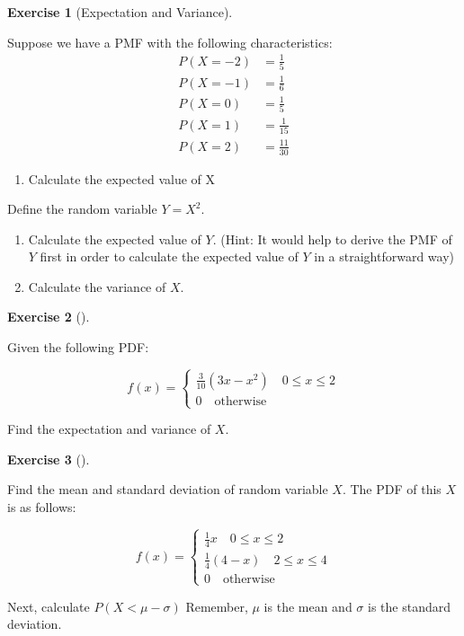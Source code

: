 \documentclass[
  letterpaper,
]{book}
\providecommand{\tightlist}{%
  \setlength{\itemsep}{0pt}\setlength{\parskip}{0pt}}\usepackage{longtable,booktabs,array}
\theoremstyle{definition}
\theoremstyle{definition}
\theoremstyle{plain}
\theoremstyle{definition}
\newtheorem{exercise}{Exercise}[chapter]
\theoremstyle{plain}
\theoremstyle{plain}
\theoremstyle{remark}
\begin{document}
\leavevmode{}%
\begin{exercise}[Expectation and Variance]\label{exr-expvar}

Suppose we have a PMF with the following characteristics: \begin{align*}
  P(X = -2) &= \frac{1}{5}\\
  P(X = -1) &= \frac{1}{6}\\
  P(X = 0) &= \frac{1}{5}\\
  P(X = 1) &= \frac{1}{15}\\
  P(X = 2) &= \frac{11}{30}
\end{align*}

\begin{enumerate}
\def\labelenumi{\arabic{enumi}.}
\tightlist
\item
  Calculate the expected value of X
\end{enumerate}

Define the random variable \(Y = X^2\).

\begin{enumerate}
\def\labelenumi{\arabic{enumi}.}
\setcounter{enumi}{1}
\item
  Calculate the expected value of \(Y\). (Hint: It would help to derive
  the PMF of \(Y\) first in order to calculate the expected value of
  \(Y\) in a straightforward way)
\item
  Calculate the variance of \(X\).
\end{enumerate}

\end{exercise}

\leavevmode{}%
\begin{exercise}[]\label{exr-expvar2}

Given the following PDF:

\[f(x) = \begin{cases} \frac{3}{10}(3x - x^2) \quad 0 \leq x \leq 2\\ 0 \quad \mathrm{ otherwise} \end{cases}\]

Find the expectation and variance of \(X\).

\end{exercise}

\leavevmode{}%
\begin{exercise}[]\label{exr-expvar3}

Find the mean and standard deviation of random variable \(X\). The PDF
of this \(X\) is as follows:

\[f(x) = \begin{cases} \frac{1}{4}x \quad 0 \leq x \leq 2\\ \frac{1}{4}(4 - x)  \quad 2 \leq x \leq 4\\ 0 \quad \mathrm{ otherwise} \end{cases}\]

Next, calculate \(P(X < \mu - \sigma)\) Remember, \(\mu\) is the mean
and \(\sigma\) is the standard deviation.

\end{exercise}
\end{document}
